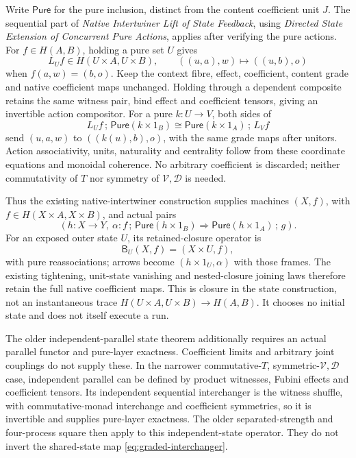 \documentclass[11pt]{article}
\begin{document}
Write $\mathsf{Pure}$ for the pure inclusion, distinct from the content coefficient unit $J$. The sequential part of \emph{Native Intertwiner Lift of State Feedback}, using \emph{Directed State Extension of Concurrent Pure Actions}, applies after verifying the pure actions. For $f\in H(A,B)$, holding a pure set $U$ gives
\[
 L_Uf\in H(U\times A,U\times B),\qquad
 ((u,a),w)\longmapsto((u,b),o)
\]
when $f(a,w)=(b,o)$. Keep the context fibre, effect, coefficient, content grade and native coefficient maps unchanged. Holding through a dependent composite retains the same witness pair, bind effect and coefficient tensors, giving an invertible action compositor. For a pure $k:U\to V$, both sides of
\[
 L_Uf\,;\,\mathsf{Pure}(k\times1_B)\cong \mathsf{Pure}(k\times1_A)\,;\,L_Vf
\]
send $(u,a,w)$ to $((k(u),b),o)$, with the same grade maps after unitors. Action associativity, units, naturality and centrality follow from these coordinate equations and monoidal coherence. No arbitrary coefficient is discarded; neither commutativity of $T$ nor symmetry of $\mathcal V,\mathcal D$ is needed.

Thus the existing native-intertwiner construction supplies machines $(X,f)$, with $f\in H(X\times A,X\times B)$, and actual pairs
\[
 (h:X\to Y,\ \alpha:f\,;\,\mathsf{Pure}(h\times1_B)\Rightarrow \mathsf{Pure}(h\times1_A)\,;\,g).
\]
For an exposed outer state $U$, its retained-closure operator is
\[
 \mathsf B_U(X,f)=(X\times U,f), \tag{RF}\label{eq:retained-feedback}
\]
with pure reassociations; arrows become $(h\times1_U,\alpha)$ with those frames. The existing tightening, unit-state vanishing and nested-closure joining laws therefore retain the full native coefficient maps. This is closure in the state construction, not an instantaneous trace $H(U\times A,U\times B)\to H(A,B)$. It chooses no initial state and does not itself execute a run.

The older independent-parallel state theorem additionally requires an actual parallel functor and pure-layer exactness. Coefficient limits and arbitrary joint couplings do not supply these. In the narrower commutative-$T$, symmetric-$\mathcal V,\mathcal D$ case, independent parallel can be defined by product witnesses, Fubini effects and coefficient tensors. Its independent sequential interchanger is the witness shuffle, with commutative-monad interchange and coefficient symmetries, so it is invertible and supplies pure-layer exactness. The older separated-strength and four-process square then apply to this independent-state operator. They do not invert the shared-state map \eqref{eq:graded-interchanger}.
\end{document}
